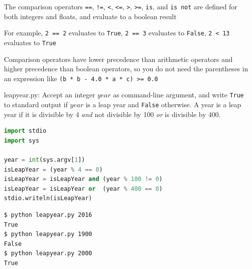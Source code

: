 \documentclass[8pt,a4paper,compress]{beamer}
\begin{document}
\begin{frame}[fragile]
\pause

The comparison operators \lstinline{==}, \lstinline{!=}, \lstinline{<}, \lstinline{<=}, \lstinline{>}, \lstinline{>=}, \lstinline{is}, and \lstinline{is not} are defined for both integers and floats, and evaluate to a boolean result

\pause
\bigskip

For example, \lstinline{2 == 2} evaluates to \lstinline{True}, \lstinline{2 == 3} evaluates to \lstinline{False}, \lstinline{2 < 13} evaluates to \lstinline{True} 

\pause
\bigskip

Comparison operators have lower precedence than arithmetic operators and higher precedence than boolean operators, so you do not need the parentheses in an expression like \lstinline{(b * b - 4.0 * a * c) >= 0.0}
\end{frame}

\begin{frame}[fragile]
\pause

\begin{framed}
\tiny leapyear.py: Accept an integer $year$ as command-line argument, and write \lstinline{True} to standard output if $year$ is a leap year and \lstinline{False} otherwise. A year is a leap year if it is divisible by 4 \emph{and} not divisible by 100 \emph{or} is divisible by 400.
\end{framed}

\begin{lstlisting}[language=Python]
import stdio
import sys

year = int(sys.argv[1])
isLeapYear = (year % 4 == 0)
isLeapYear = isLeapYear and (year % 100 != 0)
isLeapYear = isLeapYear or  (year % 400 == 0)
stdio.writeln(isLeapYear)
\end{lstlisting}

\pause

\begin{lstlisting}[language={}]
$ python leapyear.py 2016
True
$ python leapyear.py 1900
False
$ python leapyear.py 2000
True
\end{lstlisting}
\end{frame}
\end{document}
